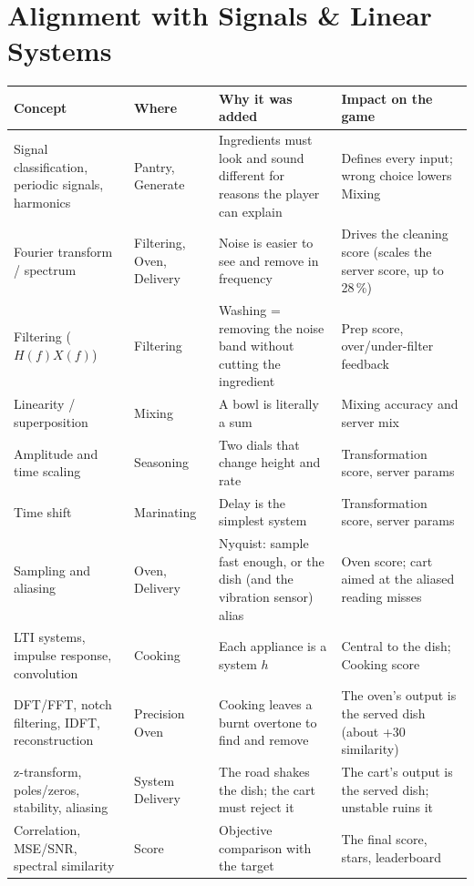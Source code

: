 \documentclass[11pt,a4paper]{article}
\begin{document}
\section{Alignment with Signals \& Linear Systems}
\begin{longtable}{@{}P{3.4cm}P{2.9cm}P{4.2cm}P{4.3cm}@{}}
\toprule
Concept & Where & Why it was added & Impact on the game \\
\midrule
\endhead
Signal classification, periodic signals, harmonics & Pantry, Generate & Ingredients must look and sound different for reasons the player can explain & Defines every input; wrong choice lowers Mixing \\
Fourier transform / spectrum & Filtering, Oven, Delivery & Noise is easier to see and remove in frequency & Drives the cleaning score (scales the server score, up to 28\,\%) \\
Filtering ($H(f)X(f)$) & Filtering & Washing = removing the noise band without cutting the ingredient & Prep score, over/under-filter feedback \\
Linearity / superposition & Mixing & A bowl is literally a sum & Mixing accuracy and server mix \\
Amplitude and time scaling & Seasoning & Two dials that change height and rate & Transformation score, server params \\
Time shift & Marinating & Delay is the simplest system & Transformation score, server params \\
Sampling and aliasing & Oven, Delivery & Nyquist: sample fast enough, or the dish (and the vibration sensor) alias & Oven score; cart aimed at the aliased reading misses \\
LTI systems, impulse response, convolution & Cooking & Each appliance is a system $h$ & Central to the dish; Cooking score \\
DFT/FFT, notch filtering, IDFT, reconstruction & Precision Oven & Cooking leaves a burnt overtone to find and remove & The oven's output is the served dish (about +30 similarity) \\
z-transform, poles/zeros, stability, aliasing & System Delivery & The road shakes the dish; the cart must reject it & The cart's output is the served dish; unstable ruins it \\
Correlation, MSE/SNR, spectral similarity & Score & Objective comparison with the target & The final score, stars, leaderboard \\
\bottomrule
\end{longtable}
\end{document}
